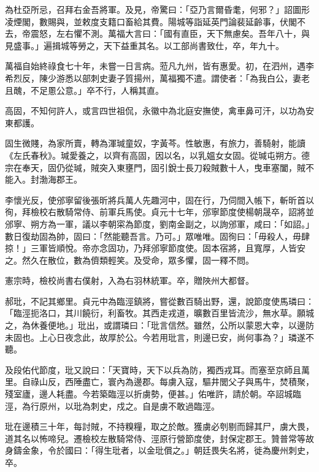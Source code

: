 \begin{pinyinscope}
 為杜亞所忌，召拜右金吾將軍。及見，帝驚曰：「亞乃言爾昏耄，何邪？」詔圖形凌煙閣，數賜與，並敕度支籍口畜給其費。陽城等詣延英門論裴延齡事，伏閣不去，帝震怒，左右懼不測。萬福大言曰：「國有直臣，天下無慮矣。吾年八十，與見盛事。」遍揖城等勞之，天下益重其名。以工部尚書致仕，卒，年九十。



 萬福自始終祿食七十年，未嘗一日言病。蒞凡九州，皆有惠愛。初，在泗州，遇李希烈反，陳少游悉以部刺史妻子質揚州，萬福獨不遣。謂使者：「為我白公，妻老且醜，不足慁公意。」卒不行，人稱其直。



 高固，不知何許人，或言四世祖侃，永徽中為北庭安撫使，禽車鼻可汗，以功為安東都護。



 固生微賤，為家所賣，轉為渾瑊童奴，字黃芩。性敏惠，有旅力，善騎射，能讀《左氏春秋》。瑊愛養之，以齊有高固，因以名，以乳媼女女固。從瑊屯朔方。德宗在奉天，固仍從瑊，賊突入東壅門，固引銳士長刀殺賊數十人，曳車塞闔，賊不能入。封渤海郡王。



 李懷光反，使邠寧留後張昕將兵萬人先趣河中，固在行，乃伺間入帳下，斬昕首以徇，拜檢校右散騎常侍、前軍兵馬使。貞元十七年，邠寧節度使楊朝晟卒，詔將並邠寧、朔方為一軍，議以李朝寀為節度，劉南金副之，以詢邠軍，咸曰：「如詔。」數日復劫固為帥，固曰：「然能聽吾言。乃可。」眾唯唯。固徇曰：「毋殺人，毋肆掠！」三軍皆順悅。帝亦念固功，乃拜邠寧節度使。固本宿將，且寬厚，人皆安之。然久在散位，數為儕類輕笑。及受命，眾多懼，固一釋不問。



 憲宗時，檢校尚書右僕射，入為右羽林統軍。卒，贈陜州大都督。



 郝玭，不記其鄉里。貞元中為臨涇鎮將，嘗從數百騎出野，還，說節度使馬璘曰：「臨涇扼洛口，其川饒衍，利畜牧。其西走戎道，曠數百里皆流沙，無水草。願城之，為休養便地。」玭出，或謂璘曰：「玭言信然。雖然，公所以蒙恩大幸，以邊防未固也。上心日夜念此，故厚於公。今若用玭言，則邊已安，尚何事為？」璘遂不聽。



 及段佑代節度，玭又說曰：「天寶時，天下以兵為防，獨西戎耳。而塞至京師且萬里。自祿山反，西陲盡亡，寰內為邊郡。每虜入寇，驅井閭父子與馬牛，焚積聚，殘室廬，邊人耗盡。今若築臨涇以折虜勢，便甚。」佑唯許，請於朝。卒詔城臨涇，為行原州，以玭為刺史，戍之。自是虜不敢過臨涇。



 玭在邊積三十年，每討賊，不持糗糧，取之於敵。獲虜必刳剔而歸其尸，虜大畏，道其名以怖啼兒。遷檢校左散騎常侍、涇原行營節度使，封保定郡王。贊普常等故身鑄金象，令於國曰：「得生玭者，以金玭償之。」朝廷畏失名將，徙為慶州刺史，卒。




\end{pinyinscope}
